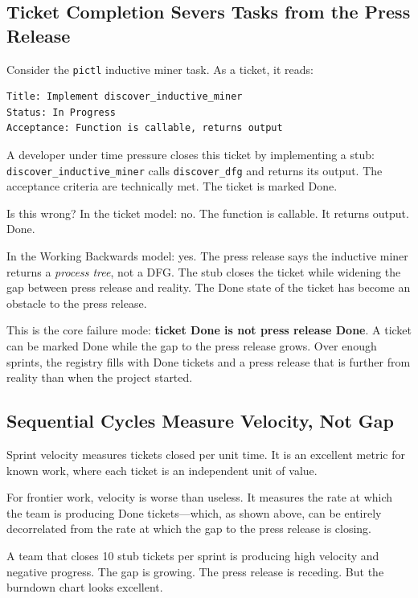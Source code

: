 \documentclass[11pt,a4paper]{article}
\newcommand{\code}[1]{\texttt{#1}}
\begin{document}
\subsection{Ticket Completion Severs Tasks from the Press Release}

Consider the \code{pictl} inductive miner task.  As a ticket, it reads:

\begin{lstlisting}
Title: Implement discover_inductive_miner
Status: In Progress
Acceptance: Function is callable, returns output
\end{lstlisting}

A developer under time pressure closes this ticket by implementing a stub:
\code{discover\_inductive\_miner} calls \code{discover\_dfg} and returns its
output.  The acceptance criteria are technically met.  The ticket is marked
Done.

Is this wrong?  In the ticket model: no.  The function is callable.  It returns
output.  Done.

In the Working Backwards model: yes.  The press release says the inductive
miner returns a \emph{process tree}, not a DFG.  The stub closes the ticket
while widening the gap between press release and reality.  The Done state of
the ticket has become an obstacle to the press release.

This is the core failure mode: \textbf{ticket Done is not press release Done}.
A ticket can be marked Done while the gap to the press release grows.  Over
enough sprints, the registry fills with Done tickets and a press release that
is further from reality than when the project started.

\subsection{Sequential Cycles Measure Velocity, Not Gap}

Sprint velocity measures tickets closed per unit time.  It is an excellent
metric for known work, where each ticket is an independent unit of value.

For frontier work, velocity is worse than useless.  It measures the rate at
which the team is producing Done tickets---which, as shown above, can be
entirely decorrelated from the rate at which the gap to the press release is
closing.

A team that closes 10 stub tickets per sprint is producing high velocity and
negative progress.  The gap is growing.  The press release is receding.
But the burndown chart looks excellent.
\end{document}
